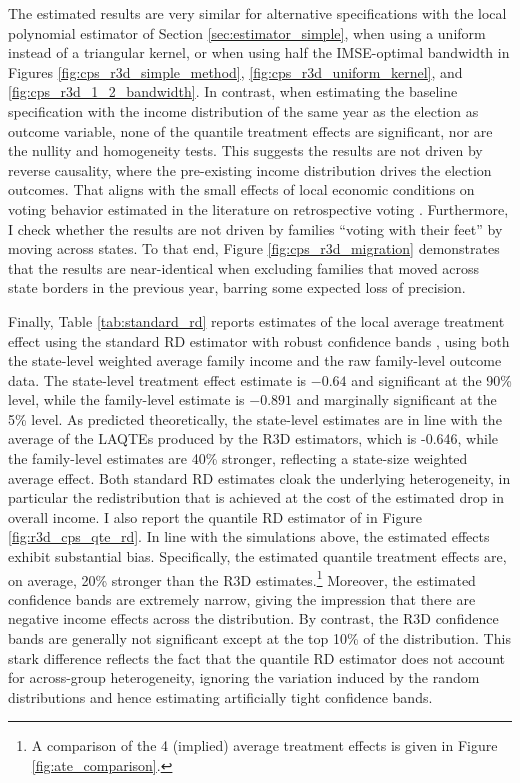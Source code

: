 \documentclass[12pt]{article}
\begin{document}
 The estimated results are very similar for alternative specifications with the local polynomial estimator of Section \ref{sec:estimator_simple}, when using a uniform instead of a triangular kernel, or when using half the IMSE-optimal bandwidth in Figures \ref{fig:cps_r3d_simple_method},  \ref{fig:cps_r3d_uniform_kernel}, and \ref{fig:cps_r3d_1_2_bandwidth}. In contrast, when estimating the baseline specification with the income distribution of the same year as the election as outcome variable, none of the quantile treatment effects are significant, nor are the nullity and homogeneity tests. This suggests the results are not driven by reverse causality, where the pre-existing income distribution drives the election outcomes. That aligns with the small effects of local economic conditions on voting behavior estimated in the literature on retrospective voting \citep{healy2013retrospective}. Furthermore, I check whether the results are not driven by families ``voting with their feet'' by moving across states. To that end, Figure \ref{fig:cps_r3d_migration} demonstrates that the results are near-identical when excluding families that moved across state borders in the previous year, barring some expected loss of precision.  

Finally, Table \ref{tab:standard_rd} reports estimates of the local average treatment effect using the standard RD estimator with robust confidence bands \citep{calonico2014robust}, using both the state-level weighted average family income and the raw family-level outcome data. The state-level treatment effect estimate is $-0.64$ and significant at the 90\% level, while the family-level estimate is $-0.891$ and marginally significant at the 5\% level. As predicted theoretically, the state-level estimates are in line with the average of the LAQTEs produced by the R3D estimators, which is -0.646, while the family-level estimates are 40\% stronger, reflecting a state-size weighted average effect. Both standard RD estimates cloak the underlying heterogeneity, in particular the redistribution that is achieved at the cost of the estimated drop in overall income. I also report the quantile RD estimator of \citet{qu2019uniform} in Figure \ref{fig:r3d_cps_qte_rd}. In line with the simulations above, the estimated effects exhibit substantial bias. Specifically, the estimated quantile treatment effects are, on average, 20\% stronger than the R3D estimates.\footnote{A comparison of the 4 (implied) average treatment effects is given in Figure \ref{fig:ate_comparison}.} Moreover, the estimated confidence bands are extremely narrow, giving the impression that there are negative income effects across the distribution. By contrast, the R3D confidence bands are generally not significant except at the top 10\% of the distribution. This stark difference reflects the fact that the quantile RD estimator does not account for across-group heterogeneity, ignoring the variation induced by the random distributions and hence estimating artificially tight confidence bands. 
\end{document}
